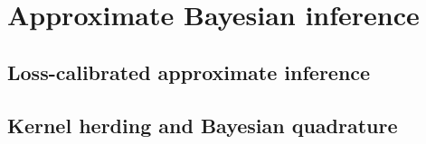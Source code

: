 \part{Approximate Bayesian inference}

\chapter{Loss-calibrated approximate inference\label{sec:approximate_inference}}


\chapter{Kernel herding and Bayesian quadrature\label{sec:herding}}
